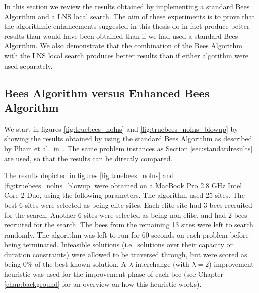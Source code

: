 In this section we review the results obtained by implementing a standard Bees Algorithm and a LNS local search. The aim of these experiments is to prove that the algorithmic enhancements suggested in this thesis do in fact produce better results than would have been obtained than if we had used a standard Bees Algorithm. We also demonstrate that the combination of the Bees Algorithm with the LNS local search produces better results than if either algorithm were used separately.

\subsection{Bees Algorithm versus Enhanced Bees Algorithm}
\label{subsec:bavebs}

We start in figures \ref{fig:truebees_nolns} and \ref{fig:truebees_nolns_blowup} by showing the results obtained by using the standard Bees Algorithm as described by Pham et al.~in~\cite{PGKORZ:2005}. The same problem instances as Section \ref{sec:standardresults} are used, so that the results can be directly compared.



The results depicted in figures \ref{fig:truebees_nolns} and \ref{fig:truebees_nolns_blowup} were obtained on a MacBook Pro 2.8 GHz Intel Core 2 Duo, using the following parameters. The algorithm used 25 sites. The best 6 sites were selected as being elite sites. Each elite site had 3 bees recruited for the search. Another 6 sites were selected as being non-elite, and had 2 bees recruited for the search. The bees from the remaining 13 sites were left to search randomly. The algorithm was left to run for 60 seconds on each problem before being terminated. Infeasible solutions (i.e.~solutions over their capacity or duration constraints) were allowed to be traversed through, but were scored as being 0\% of the best known solution. A $\lambda$-interchange (with $\lambda = 2$) improvement heuristic was used for the improvement phase of each bee (see Chapter \ref{chap:background} for an overview on how this heuristic works).

